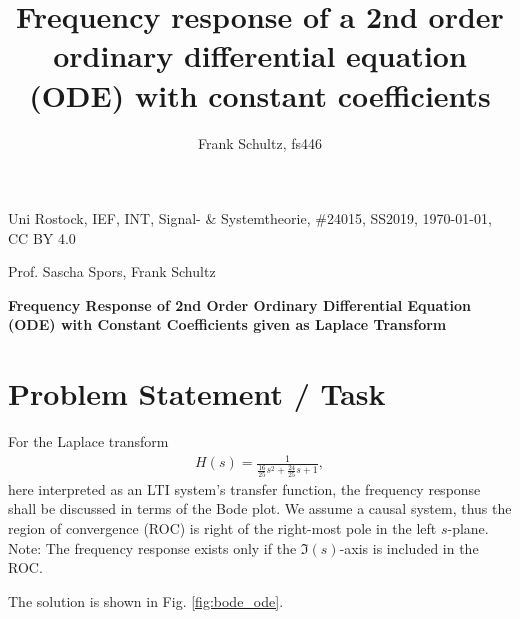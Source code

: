 \documentclass[a4paper,11pt,oneside]{scrartcl}
\title{Frequency response of a 2nd order ordinary differential equation (ODE)
with constant coefficients}
\author{Frank Schultz, fs446}
\begin{document}
%
\noindent Uni Rostock, IEF, INT, Signal- \& Systemtheorie, \#24015, SS2019,
\today, CC BY 4.0

\noindent Prof. Sascha Spors, Frank Schultz

\noindent \textbf{Frequency Response of 2nd Order Ordinary Differential Equation (ODE) with
Constant Coefficients given as Laplace Transform}

\section{Problem Statement / Task}

For the Laplace transform
\begin{align}
\label{eq:H_ODE}
H(s) = \frac{1}{\frac{16}{25} s^2 + \frac{24}{25} s + 1},
\end{align}
here interpreted as an LTI system's transfer function, the frequency response
shall be discussed in terms of the Bode plot.
%
We assume a causal system, thus the region of convergence (ROC) is right of the
right-most pole in the left $s$-plane.
%
Note: The frequency response exists only if the $\Im(s)$-axis is included
in the ROC.

The solution is shown in Fig. \ref{fig:bode_ode}.
\end{document}

